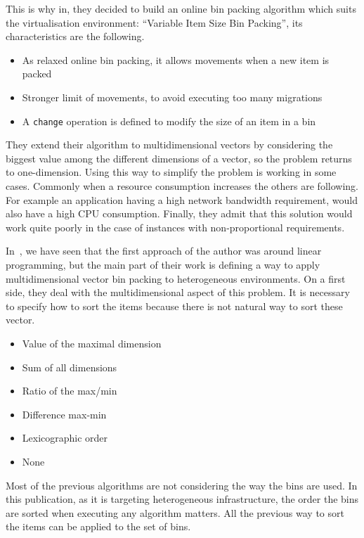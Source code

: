This is why in\cite{reassignmentVisbp}, they decided to build an online bin
packing algorithm which suits the virtualisation environment: “Variable Item
Size Bin Packing”, its characteristics are the following.

\begin{itemize}
	\item{As relaxed online bin packing, it allows movements when a new item is packed}
	\item{Stronger limit of movements, to avoid executing too many migrations}
	\item{A \texttt{change} operation is defined to modify the size of an item in a bin}
\end{itemize}

They extend their algorithm to multidimensional vectors by considering the biggest
value among the different dimensions of a vector, so the problem returns to
one-dimension. Using this way to simplify the problem is working in some cases.
Commonly when a resource consumption increases the others are following. For
example an application having a high network bandwidth requirement, would also have a
high CPU consumption. Finally, they admit that this solution would work quite poorly
in the case of instances with non-proportional requirements.

In~\cite{allocationHeterogeneous}, we have seen that the first approach of the author
was around linear programming, but the main part of their work is defining a way
to apply multidimensional vector bin packing to heterogeneous environments. On a first side,
they deal with the multidimensional aspect of this problem. It is necessary to specify how to
sort the items because there is not natural way to sort these vector.

\begin{itemize}
	\item Value of the maximal dimension
	\item Sum of all dimensions
	\item Ratio of the max/min
	\item Difference max-min
	\item Lexicographic order
	\item None
\end{itemize}

Most of the previous algorithms are not considering the way the bins are used.
In this publication, as it is targeting heterogeneous infrastructure, the order
the bins are sorted when executing any algorithm matters. All the previous way to
sort the items can be applied to the set of bins.

